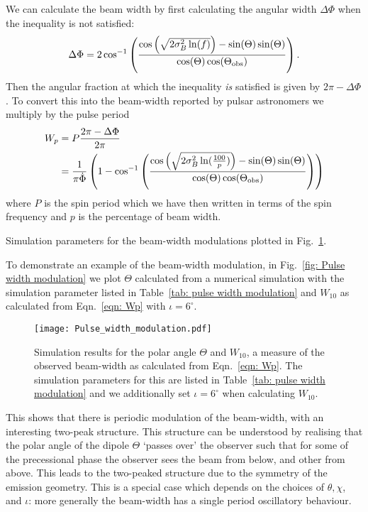 \documentclass[../full_thesis/full_thesis.tex]{subfiles}
\newcommand{\thisdir}{../inertial_frame}
\begin{document}
We can calculate the beam width by first calculating the angular width $\Delta\Phi$
when the inequality is not satisfied:
\begin{equation}
    \Delta\Phi = 2\cos^{-1}\left(
                \frac{\cos\left(\sqrt{2\sigma_{B}^{2} \ln(f)}\right) - \sin(\Theta)\sin(\Theta)}
                          {\cos(\Theta)\cos(\Theta_{\mathrm{obs}})}
                      \right).
\end{equation}
Then the angular fraction at which the inequality \emph{is} satisfied is given by
$2\pi - \Delta\Phi$. To convert this into the beam-width reported by pulsar
astronomers we multiply by the pulse period
\begin{align}
    W_{p} & = P \frac{2\pi - \Delta\Phi}{2\pi}\\
          & = \frac{1}{\pi \dot{\Phi}}\left(1 -
               \cos^{-1}\left(
                   \frac{\cos\left(\sqrt{2\sigma_{B}^{2} \ln(\frac{100}{p})}\right) - \sin(\Theta)\sin(\Theta)}
                          {\cos(\Theta)\cos(\Theta_{\mathrm{obs}})}
                      \right)
                  \right)
\label{eqn: Wp}
\end{align}
where $P$ is the spin period which we have then written in terms of the spin
frequency and $p$ is the percentage of beam width.

\begin{table}[htb]
\centering

\caption{Simulation parameters for the beam-width modulations plotted in
Fig.~\ref{fig: Pulse width modulation}.}
\label{tab: pulse width modulation}
\end{table}
To demonstrate an example of the beam-width modulation, in Fig.~\ref{fig: Pulse width
modulation} we plot $\Theta$ calculated from a numerical simulation with the
simulation parameter listed in Table~\ref{tab: pulse width modulation} and
$W_{10}$ as calculated from Eqn.~\eqref{eqn: Wp} with $\iota=6^{\circ}$.
\begin{figure}[ht]
\centering
\texttt{[image: Pulse\_width\_modulation.pdf]}
\caption{Simulation results for the polar angle $\Theta$ and $W_{10}$, a
measure of the observed beam-width as calculated from Eqn.~\eqref{eqn: Wp}.
The simulation parameters for this are listed in Table~\ref{tab: pulse width modulation}
and we additionally set $\iota=6^{\circ}$ when calculating $W_{10}$.}
\label{fig: Pulse width modulation}
\end{figure}
This shows that there is periodic modulation of the beam-width, with an
interesting two-peak structure. This structure can be understood by realising
that the polar angle of the dipole $\Theta$ `passes over' the observer such
that for some of the precessional phase the observer sees the beam from below,
and other from above. This leads to the two-peaked structure due to the
symmetry of the emission geometry. This is a special case which depends on
the choices of $\theta, \chi$, and $\iota$: more generally the beam-width has
a single period oscillatory behaviour.
\end{document}
